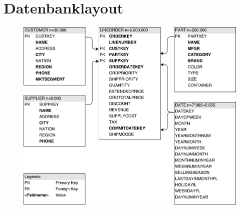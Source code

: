 \newpage

\section{Datenbanklayout}

\begin{figure}[H]
	\centering
	\includegraphics[scale=0.6]{images/ssbm_basic.pdf}
\end{figure}  

